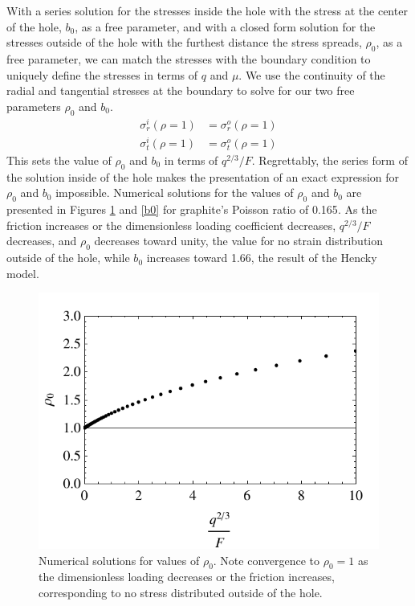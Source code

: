 With a series solution for the stresses inside the hole with the stress at the center of the hole, $b_0$, as a free parameter, and with a closed form solution for the stresses outside of the hole with the furthest distance the stress spreads, $\rho_0$, as a free parameter, we can match the stresses with the boundary condition to uniquely define the stresses in terms of $q$ and $\mu$. We use the continuity of the radial and tangential stresses at the boundary to solve for our two free parameters $\rho_0$ and $b_0$.
\begin{align*}
\sigma_r^i(\rho=1)&=\sigma_r^o(\rho=1) \\
\sigma_t^i(\rho=1)&=\sigma_t^o(\rho=1) 
\end{align*}
This sets the value of $\rho_0$ and $b_0$ in terms of $q^{2/3}/F$.  Regrettably, the series form of the solution inside of the hole makes the presentation of an exact expression for $\rho_0$ and $b_0$ impossible.  Numerical solutions for the values of $\rho_0$ and $b_0$ are presented in Figures \ref{rho0} and \ref{b0} for graphite's Poisson ratio of 0.165\cite{Blakslee1970}.  As the friction increases or the dimensionless loading coefficient decreases, $q^{2/3}/F$ decreases, and $\rho_0$ decreases toward unity, the value for no strain distribution outside of the hole, while $b_0$ increases toward 1.66, the result of the Hencky model. 

\begin{figure}
\begin{center}
\begin{center}
\includegraphics{Figs_Friction/rho0.pdf}
\end{center}
\end{center}
\caption{\label{rho0} Numerical solutions for values of $\rho_0$. Note convergence to $\rho_0 = 1$ as the dimensionless loading decreases or the friction increases, corresponding to no stress distributed outside of the hole.}
\end{figure}

